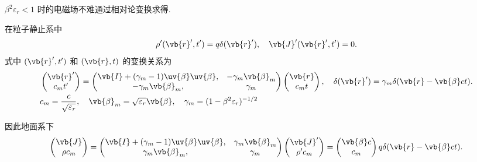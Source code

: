 \begin{notes}
	\(\beta^{2} \varepsilon_{r} < 1\) 时的电磁场不难通过相对论变换求得.

	在粒子静止系中
	\begin{equation*}
		\rho'(\vb{r}', t') = q \delta(\vb{r}'), \quad
		\vb{J}'(\vb{r}', t') = 0.
	\end{equation*}
	式中 \((\vb{r}', t')\) 和 \((\vb{r}, t)\) 的变换关系为
	\begin{align*}
		&\begin{pmatrix}
			\vb{r}' \\
			c_{m} t'
		\end{pmatrix} =
		\begin{pmatrix}
			\vb{I} + (\gamma_{m} - 1) \uv{\beta} \uv{\beta}, & -\gamma_{m} \vb{\beta}_{m} \\
			-\gamma_{m} \vb{\beta}_{m},                      & \gamma_{m}
		\end{pmatrix}
		\begin{pmatrix}
			\vb{r} \\
			c_{m} t
		\end{pmatrix}, \quad
		\delta(\vb{r}') = \gamma_{m} \delta(\vb{r} - \vb{\beta} c t).\\
		&c_{m} = \frac{c}{\sqrt{\varepsilon_{r}}}, \quad \vb{\beta}_{m} = \sqrt{\varepsilon_{r}} \vb{\beta}, \quad \gamma_{m} = (1 - \beta^{2} \varepsilon_{r})^{-1/2}
	\end{align*}

	因此地面系下
	\begin{equation*}
		\begin{pmatrix}
			\vb{J} \\
			\rho c_{m}
		\end{pmatrix} =
		\begin{pmatrix}
			\vb{I} + (\gamma_{m} - 1) \uv{\beta} \uv{\beta}, & \gamma_{m} \vb{\beta}_{m} \\
			\gamma_{m} \vb{\beta}_{m},                       & \gamma_{m}
		\end{pmatrix}
		\begin{pmatrix}
			\vb{J}' \\
			\rho' c_{m}
		\end{pmatrix}
		=
		\begin{pmatrix}
			\vb{\beta} c \\
			c_{m}
		\end{pmatrix} q \delta(\vb{r} - \vb{\beta} c t).
	\end{equation*}


\end{notes}
